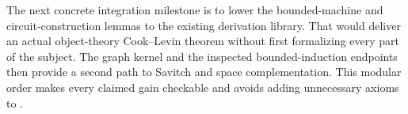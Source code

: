 The next concrete integration milestone is to lower the bounded-machine
and circuit-construction lemmas to the existing derivation library. That
would deliver an actual object-theory Cook--Levin theorem without first
formalizing every part of the subject. The graph kernel and the inspected
bounded-induction endpoints then provide a second path to Savitch and
space complementation. This modular order makes every claimed gain
checkable and avoids adding unnecessary axioms to \ipra.
